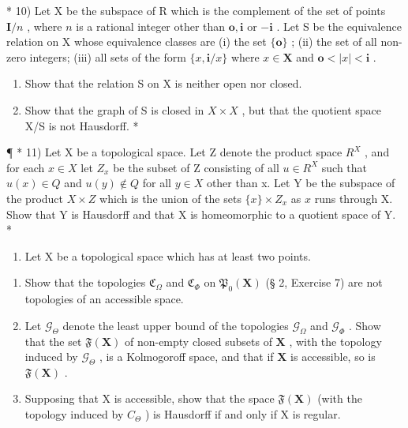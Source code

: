 * 10) Let X be the subspace of R which is the complement of the set of points \(\mathbf{I} / n\) , where \(n\) is a rational integer other than \(\mathbf{o}, \mathbf{i}\) or \(-\mathbf{i}\) . Let S be the equivalence relation on X whose equivalence classes are (i) the set \(\{\mathbf{o}\}\) ; (ii) the set of all non-zero integers; (iii) all sets of the form \(\{x, \mathbf{i} / x\}\) where \(x \in \mathbf{X}\) and \(\mathbf{o} < |x| < \mathbf{i}\) .

\begin{enumerate}
\def\labelenumi{\alph{enumi})}
\item
  Show that the relation S on X is neither open nor closed.
\item
  Show that the graph of S is closed in \(X \times X\) , but that the quotient space X/S is not Hausdorff. *
\end{enumerate}

¶ * 11) Let X be a topological space. Let Z denote the product space \(R^{X}\) , and for each \(x \in X\) let \(Z_{x}\) be the subset of Z consisting of all \(u \in R^{X}\) such that \(u(x) \in Q\) and \(u(y) \notin Q\) for all \(y \in X\) other than x. Let Y be the subspace of the product \(X \times Z\) which is the union of the sets \(\{x\} \times Z_x\) as \(x\) runs through X. Show that Y is Hausdorff and that X is homeomorphic to a quotient space of Y. *

\begin{enumerate}
\def\labelenumi{\arabic{enumi})}
\setcounter{enumi}{11}
\tightlist
\item
  Let X be a topological space which has at least two points.
\end{enumerate}

\begin{enumerate}
\def\labelenumi{\alph{enumi})}
\item
  Show that the topologies \(\mathfrak{C}_{\Omega}\) and \(\mathfrak{C}_{\Phi}\) on \(\mathfrak{P}_0(\mathbf{X})\) (§ 2, Exercise 7) are not topologies of an accessible space.
\item
  Let \(\mathcal{G}_{\Theta}\) denote the least upper bound of the topologies \(\mathcal{G}_{\Omega}\) and \(\mathcal{G}_{\Phi}\) . Show that the set \(\mathfrak{F}(\mathbf{X})\) of non-empty closed subsets of \(\mathbf{X}\) , with the topology induced by \(\mathcal{G}_{\Theta}\) , is a Kolmogoroff space, and that if \(\mathbf{X}\) is accessible, so is \(\mathfrak{F}(\mathbf{X})\) .
\item
  Supposing that X is accessible, show that the space \(\mathfrak{F}(\mathbf{X})\) (with the topology induced by \(C_{\Theta}\) ) is Hausdorff if and only if X is regular.
\end{enumerate}

